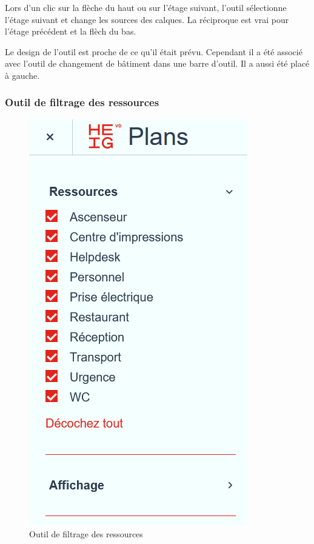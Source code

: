 \documentclass[
    iai, %
    il, %
]{heig-tb}
\begin{document}
Lors d'un clic sur la flèche du haut ou sur l'étage suivant, l'outil sélectionne l'étage suivant
et change les sources des calques. La réciproque est vrai pour l'étage précédent et la flèch du bas.

Le design de l'outil est proche de ce qu'il était prévu. Cependant il a été associé avec l'outil de changement de bâtiment dans une barre d'outil.
Il a aussi été placé à gauche.

\subsubsection{Outil de filtrage des ressources}

\begin{figure}[h]
    \centering
    \includegraphics[scale=0.5]{frontend-filtresRessources.png}
    \caption{Outil de filtrage des ressources}
    \label{fig:ressources-filtre}
\end{figure}
\end{document}
